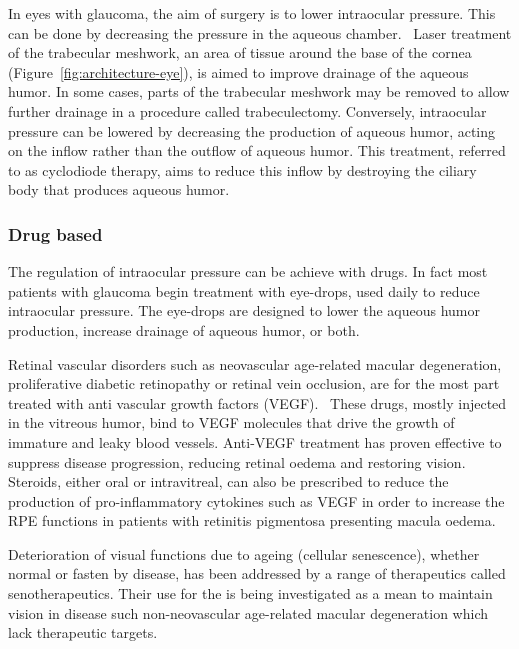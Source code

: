 \documentclass{article}
\begin{document}
In eyes with glaucoma, the aim of surgery is to lower intraocular pressure.
This can be done by decreasing the pressure in the aqueous chamber.~\cite{Quigley_2011}
Laser treatment of the trabecular meshwork, an area of tissue around the base of the cornea (Figure~\ref{fig:architecture-eye}), is aimed to improve drainage of the aqueous humor.
In some cases, parts of the trabecular meshwork may be removed to allow further drainage in a procedure called trabeculectomy.
Conversely, intraocular pressure can be lowered by decreasing the production of aqueous humor, acting on the inflow rather than the outflow of aqueous humor.
This treatment, referred to as cyclodiode therapy, aims to reduce this inflow by destroying the ciliary body that produces aqueous humor.~\cite{Allbon_2022}

\subsubsection*{Drug based}

The regulation of intraocular pressure can be achieve with drugs.
In fact most patients with glaucoma begin treatment with eye-drops, used daily to reduce intraocular pressure.
The eye-drops are designed to lower the aqueous humor production, increase drainage of aqueous humor, or both.~\cite{Chakrabarti_2022,Quigley_2011}

Retinal vascular disorders such as neovascular age-related macular degeneration, proliferative diabetic retinopathy or retinal vein occlusion, are for the most part treated with anti vascular growth factors (VEGF).~\cite{Andreoli_2007,Kim_2021}
These drugs, mostly injected in the vitreous humor, bind to VEGF molecules that drive the growth of immature and leaky blood vessels.
Anti-VEGF treatment has proven effective to suppress disease progression, reducing retinal oedema and restoring vision.~\cite{Andreoli_2007,Heier_2006,Kim_2021}
Steroids, either oral or intravitreal, can also be prescribed to reduce the production of pro-inflammatory cytokines such as VEGF in order to increase the RPE functions in patients with retinitis pigmentosa presenting macula oedema.~\cite{Strong_2016}

Deterioration of visual functions due to ageing (cellular senescence), whether normal or fasten by disease, has been addressed by a range of therapeutics called senotherapeutics.
Their use for the is being investigated as a mean to maintain vision in disease such non-neovascular age-related macular degeneration which lack therapeutic targets.~\cite{Lee_2021}
\end{document}
